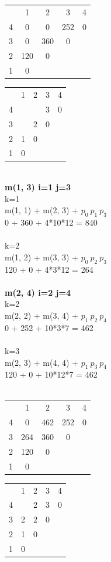 \documentclass{article}
\begin{document}
\begin{tabular}{ c | c | c | c | c }
            
    & 1 & 2 & 3 & 4 \\ 
  4 & 0 & 0 & 252 & 0 \\  
  3 & 0 & 360 & 0 \\
  2 & 120 & 0 \\
  1 & 0     
\end{tabular}
\begin{tabular}{ c | c | c | c | c }
            
    & 1 & 2 & 3 & 4 \\ 
  4 &   &   & 3 & 0 \\  
  3 &   & 2 & 0 \\
  2 & 1 & 0 \\
  1 & 0     
\end{tabular}\\

    \textbf{m(1, 3) i=1 j=3} \\
    k=1 \\
    m(1, 1) + m(2, 3) + $ p_{0}\ p_{1}\  p_{3}$\\
    0 + 360 + 4*10*12 = 840 \\\\

    k=2 \\
    m(1, 2) + m(3, 3) + $ p_{0}\ p_{2}\  p_{3}$\\
    120 + 0 + 4*3*12 = 264\\\\

    \textbf{m(2, 4) i=2 j=4} \\
    k=2 \\
    m(2, 2) + m(3, 4) + $ p_{1}\ p_{2}\  p_{4}$\\
    0 + 252 + 10*3*7 = 462 \\\\

    k=3 \\
    m(2, 3) + m(4, 4) + $ p_{1}\ p_{3}\  p_{4}$\\
    120 + 0 + 10*12*7 = 462\\\\

    \begin{tabular}{ c | c | c | c | c }
            
        & 1 & 2 & 3 & 4 \\ 
    4 & 0 & 462 & 252 & 0 \\  
    3 & 264 & 360 & 0 \\
    2 & 120 & 0 \\
    1 & 0     
    \end{tabular}
    \begin{tabular}{ c | c | c | c | c }
            
        & 1 & 2 & 3 & 4 \\ 
      4 &   & 2 & 3 & 0 \\  
      3 & 2 & 2 & 0 \\
      2 & 1 & 0 \\
      1 & 0     
    \end{tabular}\\
\end{document}
